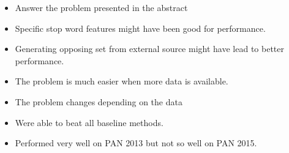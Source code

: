 %
%
%
%
%
%
%



\begin{itemize}
    \item Answer the problem presented in the abstract
    \item Specific stop word features might have been good for performance.
    \item Generating opposing set from external source might have lead to better
        performance.
    \item The problem is much easier when more data is available.
    \item The problem changes depending on the data
    \item Were able to beat all baseline methods.
    \item Performed very well on PAN 2013 but not so well on PAN 2015.
\end{itemize}

